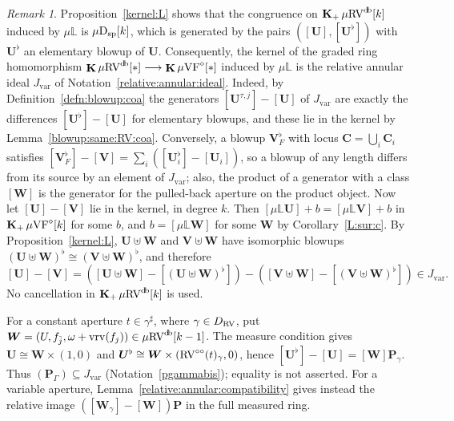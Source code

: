 \documentclass[12pt]{amsart}
\theoremstyle{plain}
\theoremstyle{definition}
\theoremstyle{remark}
\newtheorem{rem}[thm]{Remark}
\numberwithin{equation}{section}
\theoremstyle{plain}
\newcommand{\VF}{\textup{VF}}
\newcommand{\RV}{\textup{RV}}
\newcommand{\0}{\emptyset}
\newcommand{\bb}[1]{\mathbb{#1}}
\newcommand{\fun}{\longrightarrow}
\newcommand{\sub}{\subseteq}
\newcommand{\mVF}{{\mu}{\VF}}
\newcommand{\mRV}{{\mu}{\RV}}
\newcommand{\dsp}{\textup{D}_{\textup{sp}}}
\newcommand{\mispdb}{\mu \dsp}
\newcommand{\mL}{{\mu}{\bb L}}
\DeclareMathOperator{\gsk}{\mathbf{K}_+}
\DeclareMathOperator{\ggk}{\mathbf{K}}
\DeclareMathOperator{\vrv}{vrv}
\DeclareMathOperator{\db}{d \! b}
\newcommand{\ccirc}{\circ \circ}
\begin{document}
\begin{rem}\label{thekernel}
Proposition~\ref{kernel:L} shows that the congruence on $\gsk \mRV^{\db}[k]$ induced by $\mL$ is $\mispdb[k]$, which is generated by the pairs $([\bm U], [\bm U^\flat])$ with $\bm U^\flat$ an elementary blowup of $\bm U$. Consequently, the kernel of the graded ring homomorphism $\ggk \mRV^{\db}[*] \fun \ggk \mVF^\diamond[*]$ induced by $\mL$ is the relative annular ideal $J_{\mathrm{var}}$ of Notation~\ref{relative:annular:ideal}. Indeed, by Definition~\ref{defn:blowup:coa} the generators $[\bm U^{\tau, j}] - [\bm U]$ of $J_{\mathrm{var}}$ are exactly the differences $[\bm U^\flat] - [\bm U]$ for elementary blowups, and these lie in the kernel by Lemma~\ref{blowup:same:RV:coa}. Conversely, a blowup $\bm V^\flat_F$ with locus $\bm C = \bigcup_i \bm C_i$ satisfies $[\bm V^\flat_F] - [\bm V] = \sum_i ([\bm U_i^\flat] - [\bm U_i])$, so a blowup of any length differs from its source by an element of $J_{\mathrm{var}}$; also, the product of a generator with a class $[\bm W]$ is the generator for the pulled-back aperture on the product object. Now let $[\bm U] - [\bm V]$ lie in the kernel, in degree $k$. Then $[\mL \bm U] + b = [\mL \bm V] + b$ in $\gsk \mVF^\diamond[k]$ for some $b$, and $b = [\mL \bm W]$ for some $\bm W$ by Corollary~\ref{L:sur:c}. By Proposition~\ref{kernel:L}, $\bm U \uplus \bm W$ and $\bm V \uplus \bm W$ have isomorphic blowups $(\bm U \uplus \bm W)^\flat \cong (\bm V \uplus \bm W)^\flat$, and therefore
\[
[\bm U] - [\bm V] = ([\bm U \uplus \bm W] - [(\bm U \uplus \bm W)^\flat]) - ([\bm V \uplus \bm W] - [(\bm V \uplus \bm W)^\flat]) \in J_{\mathrm{var}}.
\]
No cancellation in $\gsk \mRV^{\db}[k]$ is used.

For a constant aperture $t \in \gamma^\sharp$, where $\gamma \in D_{\RV}$, put $\bm W = (U, f_{\tilde j}, \omega + \vrv(f_j)) \in \mRV^{\db}[k-1]$. The measure condition gives $\bm U \cong \bm W \times (1, 0)$ and $\bm U^\flat \cong \bm W \times (\RV^{\ccirc}(t)_\gamma, 0)$, hence $[\bm U^\flat] - [\bm U] = [\bm W] \bm P_\gamma$. Thus $(\bm P_\Gamma) \sub J_{\mathrm{var}}$ (Notation~\ref{pgammabis}); equality is not asserted. For a variable aperture, Lemma~\ref{relative:annular:compatibility} gives instead the relative image $([\bm W_\gamma] - [\bm W]) \bm P$ in the full measured ring.
\end{rem}
\end{document}
